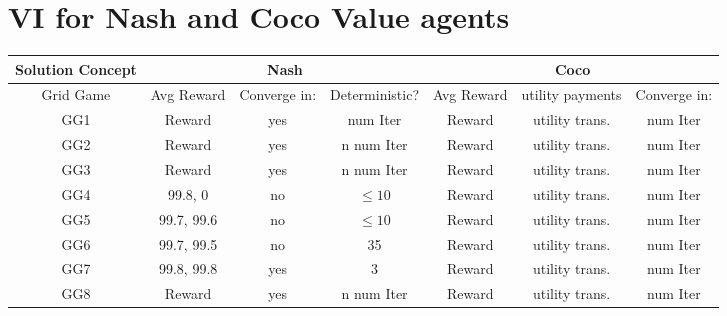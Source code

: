\section{VI for Nash and Coco Value agents}
\begin{tabular}{||c||c|c||c|c||c|c||}
	\hline
	Solution Concept&  \multicolumn{3}{|c||}{Nash} &
	 \multicolumn{3}{|c||}{Coco}  \\ \hline
	Grid Game & Avg Reward & Converge in: & Deterministic? & Avg Reward & utility payments & Converge in: \\ \hline \hline
	GG1 & Reward & yes & num Iter & Reward & utility trans. & num Iter\\ \hline
	GG2 & Reward & yes & n num Iter & Reward & utility trans. & num Iter\\ \hline
	GG3 & Reward & yes & n num Iter & Reward & utility trans. & num Iter\\ \hline
	GG4 & 99.8, 0 & no & $\leq 10$ & Reward & utility trans. & num Iter\\ \hline
	GG5 & 99.7, 99.6 & no & $\leq 10$ & Reward & utility trans. & num Iter\\ \hline
	GG6 & 99.7, 99.5 & no & 35 & Reward & utility trans. & num Iter\\ \hline
	GG7 & 99.8, 99.8 & yes & 3 & Reward & utility trans. & num Iter\\ \hline
	GG8 & Reward & yes & n num Iter & Reward & utility trans. & num Iter\\ \hline
	
\end{tabular}


